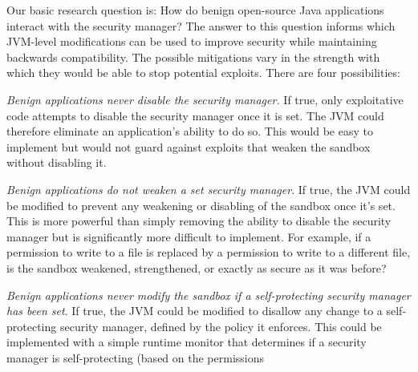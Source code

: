 \documentclass{sig-alternate}
\begin{document}
Our basic research question is: How do benign open-source Java applications interact
with the security manager? The answer to this question informs which JVM-level
modifications can be used to improve security
while maintaining backwards compatibility.  The
possible mitigations vary in the strength with which they would be able to stop
potential exploits. 
There are four possibilities:
\begin{flushenum}	\setlength{\parskip}{0pt}
  \setlength{\parsep}{0pt}
  \setlength{\itemsep}{0pt}
\item \textit{Benign applications never disable the security manager.}  If true,
  only exploitative code attempts to disable the security manager once it is set.
  The JVM could therefore eliminate an application's ability to
  do so.  This would be easy to implement but would not guard against exploits
  that weaken the sandbox without disabling it.
\item \textit{Benign applications do not weaken a set security manager}.  If
  true, the JVM could be modified to prevent any weakening or disabling of the 
  sandbox once it's set.  This is more powerful than simply removing the
  ability to disable the security manager but is significantly more difficult to
  implement.
  For example, if a permission to write to a file is
  replaced by a permission to write to a different file, is the sandbox
  weakened, strengthened, or exactly as secure as it was before?
\item \textit{Benign applications never modify the sandbox if a self-protecting
    security manager has been set}. If true, the JVM could be modified to
  disallow any change to a self-protecting security manager, defined by the
  policy it enforces.  This could be implemented with a simple runtime monitor that
  determines if a security manager is self-protecting (based on the permissions

\end{flushenum}
\end{document}
